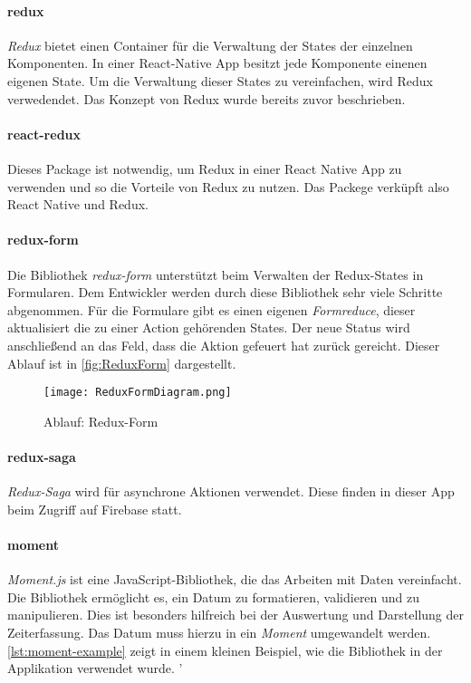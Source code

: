 \paragraph{redux}
\textit{Redux} bietet einen Container für die Verwaltung der States der einzelnen Komponenten.
In einer React-Native App besitzt jede Komponente einenen eigenen State. Um die Verwaltung dieser
States zu vereinfachen, wird Redux verwedendet. Das Konzept von Redux wurde bereits zuvor beschrieben.
\cite{Redux:online}

\paragraph{react-redux}
Dieses Package ist notwendig, um Redux in einer React Native App zu verwenden und so die Vorteile von
Redux zu nutzen. Das Packege verküpft also React Native und Redux.
\cite{ReactRedux:online}

\paragraph{redux-form}
Die Bibliothek \textit{redux-form} unterstützt beim Verwalten der Redux-States in Formularen.
Dem Entwickler werden durch diese Bibliothek sehr viele Schritte abgenommen. Für die Formulare
gibt es einen eigenen \textit{Formreduce}, dieser aktualisiert die zu einer Action gehörenden States.
Der neue Status wird anschließend an das Feld, dass die Aktion gefeuert hat zurück gereicht. Dieser
Ablauf ist in \autoref{fig:ReduxForm} dargestellt. \cite{ReduxForm:online}

\begin{figure}[h]
    \centering
    \texttt{[image: ReduxFormDiagram.png]}
    \caption{Ablauf: Redux-Form}
    \label{fig:ReduxForm}
\end{figure}

\paragraph{redux-saga}
\textit{Redux-Saga} wird für asynchrone Aktionen verwendet. Diese finden in dieser
App beim Zugriff auf Firebase statt. \cite{ReduxSaga:online,}

\paragraph{moment}
\textit{Moment.js} ist eine JavaScript-Bibliothek, die das Arbeiten mit Daten vereinfacht. Die Bibliothek ermöglicht es,
ein Datum zu formatieren, validieren und zu manipulieren. Dies ist besonders hilfreich bei der Auswertung und Darstellung der
Zeiterfassung. Das Datum muss hierzu in ein \textit{Moment} umgewandelt werden. \autoref{lst:moment-example} zeigt in einem kleinen Beispiel,
wie die Bibliothek in der Applikation verwendet wurde.\cite{MomentJS:online}
'

